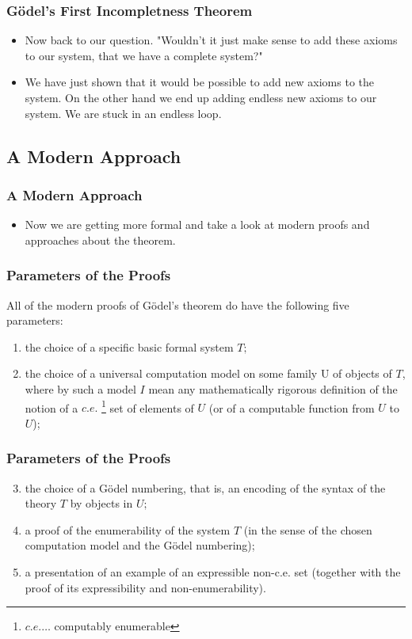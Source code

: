 \documentclass[aspectratio=169]{beamer}
\begin{document}
\begin{frame}
	\frametitle{Gödel's First Incompletness Theorem}
	\begin{itemize}
		\item Now back to our question. "Wouldn't it just make sense to add these axioms to our system, that we have a complete system?"
		\item We have just shown that it would be possible to add new axioms to the system. On the other hand we end up adding endless new axioms to our system. We are stuck in an endless loop.
	\end{itemize}
\end{frame}

\subsection{A Modern Approach}
\begin{frame}
	\frametitle{A Modern Approach}
	\begin{itemize}
		\item Now we are getting more formal and take a look at modern proofs and approaches about the theorem.
	\end{itemize}
\end{frame}

\begin{frame}
	\frametitle{Parameters of the Proofs}
	All of the modern proofs of Gödel's theorem do have the following five parameters: \\ \vspace{0.5cm}
	\begin{enumerate}
		\item the choice of a specific basic formal system $T;$
		\item the choice of a universal computation model on some family U of objects of $T$, where by such a model $I$ mean any mathematically rigorous definition of the notion of a $c.e.$ \footnote[frame]{$c.e. \ldots $ computably enumerable} set of elements of $U$ (or of a computable function from $U$ to $U$);
	\end{enumerate}
\end{frame}

\begin{frame}
	\frametitle{Parameters of the Proofs}
	\begin{enumerate}
	\setcounter{enumi}{2}
		\item the choice of a Gödel numbering, that is, an encoding of the syntax of the theory $T$ by objects in $U;$
		\item a proof of the enumerability of the system $T$ (in the sense of the chosen computation model and the Gödel numbering);
		\item a presentation of an example of an expressible non-c.e. set (together with the proof of its expressibility and non-enumerability).
	\end{enumerate}
	\begin{flushright}
		\cite{bekl}
	\end{flushright}
\end{frame}
\end{document}
